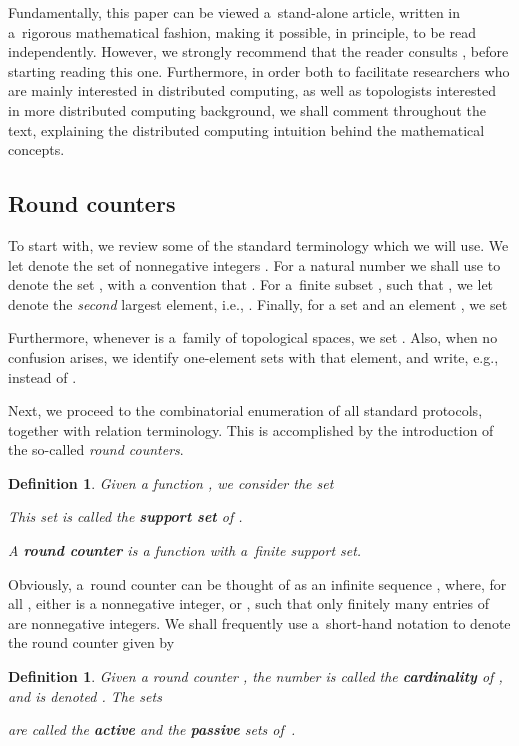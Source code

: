 \documentclass{amsart}[10pt]
\newtheorem{df}[theorem]{Definition}
\numberwithin{equation}{section}
\numberwithin{figure}{section}
\numberwithin{table}{section}
\begin{document}
Fundamentally, this paper can be viewed a~stand-alone article, written
in a~rigorous mathematical fashion, making it possible, in principle,
to be read independently. However, we strongly recommend that the
reader consults \cite{k1}, before starting reading this
one. Furthermore, in order both to facilitate researchers who are
mainly interested in distributed computing, as well as topologists
interested in more distributed computing background, we shall comment
throughout the text, explaining the distributed computing intuition
behind the mathematical concepts.

\subsection{Round counters} 

\nin To start with, we review some of the standard terminology which
we will use. We let  denote the set of nonnegative integers
.  For a natural number  we shall use  to
denote the set , with a convention that .
For a~finite subset , such that , we let
 denote the {\it second} largest element, i.e., . Finally, for a set  and an element
, we set

\nin Furthermore, whenever  is a~family of topological
spaces, we set .  Also, when no confusion
arises, we identify one-element sets with that element, and write,
e.g.,  instead of .


Next, we proceed to the combinatorial enumeration of all standard
protocols, together with relation terminology. This is accomplished by
the introduction of the so-called {\it round counters}.

\begin{df}
Given a function , we consider
the set
 
This set is called the {\bf support set} of .

\nin A {\bf round counter} is a function
 with a~finite support set.
\end{df}

Obviously, a~round counter can be thought of as an infinite sequence
, where, for all , either
 is a nonnegative integer, or , such that only
finitely many entries of  are nonnegative integers. We shall
frequently use a~short-hand notation  to denote
the round counter given by


\begin{df}
Given a round counter , the number  is
called the {\bf cardinality} of , and is denoted . The
sets
 
are called the {\bf active} and the {\bf passive} sets of~.
\end{df}
\end{document}
